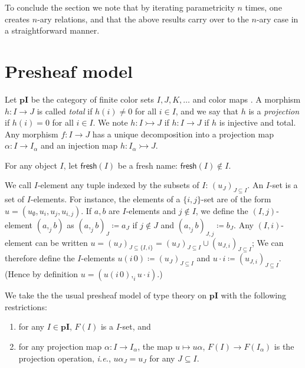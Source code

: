 \documentclass[english]{PaperTools/latex/lipics}
\def\pI{\ensuremath{\mathbf{pI}}}
\def\fresh#1{\mathsf{fresh}(#1)}
\def\ie{\textit{i.e.}}
\begin{document}
To conclude the section we note that by iterating parametricity $n$
times, one creates $n$-ary relations, and that the above results carry
over to the $n$-ary case in a straightforward manner.
\section{Presheaf model}

\begin{definition}
  Let \pI{} be the category of finite color sets $I,J,K,…$ and color
  maps \cite[ex.~9.7 p.~176]{PittsAM:nomsns}.
  A morphism $h : I → J$ is called \emph{total} if $h(i) ≠ 0$ for all $i ∈ I$,
  and we say that $h$ is a \emph{projection} if $h(i) = 0$ for all $i ∈ I$.
  We note $h : I ↣ J$ if $h : I → J$ if $h$ is injective and total.
  Any morphism $f : I → J$ has a unique decomposition into a projection map
  $α : I → I_α$ and an injection map $h : I_α ↣ J$.


  For any object $I$, let $\fresh{I}$ be a fresh name: $\fresh{I} ∉ I$.
\end{definition}

\begin{definition}
  We call $I$-element any tuple indexed by the subsets of $I$: $(u_J)_{J ⊆ I}$.
  An $I$-set is a set of $I$-elements.  For instance, the elements of a
  $\{i,j\}$-set are of the form $u = (u_∅,u_i,u_j,u_{i,j})$.
  If $a,b$ are $I$-elements and $j ∉ I$, we define the $(I,j)$-element
  $(a ,_j b)$ as $(a ,_j b)_J ≔ a_J$ if $j ∉ J$ and $(a ,_j b)_{J,j} ≔ b_J$.
  Any $(I,i)$-element can be written $u = (u_J)_{J ⊆ \{I,i\}} = (u_J)_{J ⊆ I} ∪ (u_{J,i})_{J ⊆ I}$;
  We can therefore define the $I$-elements $u (i\,0) ≔ (u_J)_{J ⊆ I}$ and $u · i ≔ (u_{J,i})_{J ⊆ I}$.
  (Hence by definition $u = (u (i\,0) ,_i u · i)$.)
\end{definition}

\bigskip
We take the the usual presheaf model of type theory on \pI{} with the
following restrictions:
\begin{enumerate}
  \item for any $I ∈ \pI$, $F(I)$ is a $I$-set, and
  \item for any projection map $α : I → I_α$, the
    map $u ↦ uα$, $F(I) → F(I_α)$ is the projection operation, \ie,
    $uα_J = u_J$ for any $J ⊆ I$.
\end{enumerate}
\end{document}

